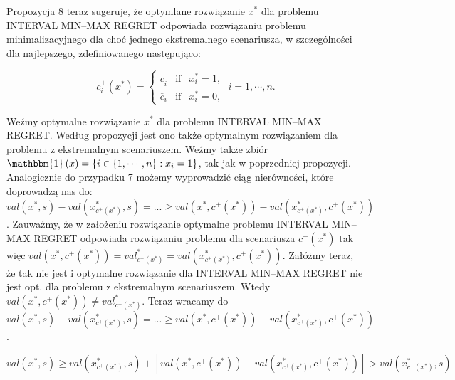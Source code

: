 Propozycja 8 teraz sugeruje, że optymlane rozwiązanie $x^{\ast}$ dla problemu INTERVAL MIN–MAX REGRET odpowiada rozwiązaniu problemu minimalizacyjnego dla choć jednego ekstremalnego scenariusza, w szczególności dla najlepszego, zdefiniowanego następująco:

\begin{equation}
c_{i}^{+} \left( x^{\ast} \right) =
\left\{\begin{matrix}
\underline{c}_{i}	&	\textrm{if}	&	x^{\ast}_{i} = 1, \\ 
\overline{c}_{i}	&	\textrm{if}	&	x^{\ast}_{i} = 0,
\end{matrix}\right.
\; i = 1, \cdots, n.
\end{equation}

Weźmy optymalne rozwiązanie $x^{\ast}$ dla problemu INTERVAL MIN–MAX REGRET. Według propozycji jest ono także optymalnym rozwiązaniem dla problemu z ekstremalnym scenariuszem. Weźmy także zbiór $\mathbbm{1} \left( x \right) = \left\{ i \in \left\{ 1, \cdots, n \right\} : x_{i} = 1 \right\}$, tak jak w poprzedniej propozycji. Analogicznie do przypadku 7 możemy wyprowadzić ciąg nierówności, które doprowadzą nas do: $val \left( x^{\ast}, s \right) - val \left( x^{\ast}_{c^{+} \left( x^{\ast} \right)}, s \right) = ... \geqslant val \left( x^{\ast}, c^{+} \left( x^{\ast} \right) \right) - val \left( x^{\ast}_{c^{+} \left( x^{\ast} \right)}, c^{+} \left( x^{\ast} \right) \right)$. Zauważmy, że w założeniu rozwiązanie optymalne problemu INTERVAL MIN–MAX REGRET odpowiada rozwiązaniu problemu dla scenariusza $c^{+} \left( x^{\ast}\right)$ tak więc $val \left( x^{\ast}, c^{+} \left( x^{\ast} \right) \right) = val^{*}_{c^{+} \left( x^{\ast} \right)} = val \left( x^{\ast}_{c^{+} \left( x^{\ast} \right)}, c^{+} \left( x^{\ast} \right) \right)$. Załóżmy teraz, że tak nie jest i optymalne rozwiązanie dla INTERVAL MIN–MAX REGRET nie jest opt. dla problemu z ekstremalnym scenariuszem. Wtedy $val \left( x^{\ast}, c^{+} \left( x^{\ast} \right) \right) \neq val^{*}_{c^{+} \left( x^{\ast} \right)}$. Teraz wracamy do $val \left( x^{\ast}, s \right) - val \left( x^{\ast}_{c^{+} \left( x^{\ast} \right)}, s \right) = ... \geqslant val \left( x^{\ast}, c^{+} \left( x^{\ast} \right) \right) - val \left( x^{\ast}_{c^{+} \left( x^{\ast} \right)}, c^{+} \left( x^{\ast} \right) \right)$.

$val \left( x^{\ast}, s \right) \geqslant  val \left( x^{\ast}_{c^{+} \left( x^{\ast} \right)}, s \right) + \left[ val \left( x^{\ast}, c^{+} \left( x^{\ast} \right) \right) - val \left( x^{\ast}_{c^{+} \left( x^{\ast} \right)}, c^{+} \left( x^{\ast} \right) \right) \right] > val \left( x^{\ast}_{c^{+} \left( x^{\ast} \right)}, s \right)$

